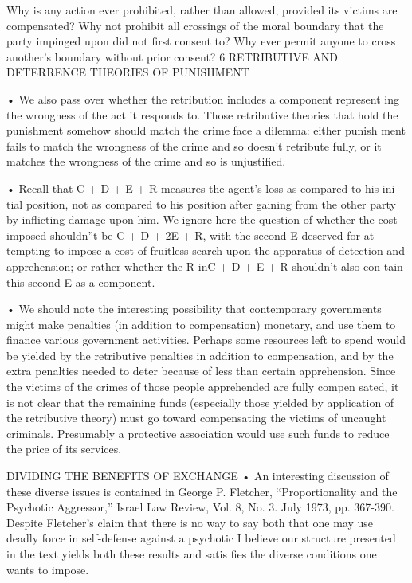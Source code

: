 \documentclass[11pt,openany]{book}
\begin{document}
{Why is any action ever prohibited, rather than allowed, provided its victims are compensated? Why not prohibit all crossings of the moral boundary that the party impinged upon did not first consent to? Why ever permit anyone to cross another's boundary without prior consent? 6 RETRIBUTIVE AND DETERRENCE THEORIES OF PUNISHMENT\par

• We also pass over whether the retribution includes a component represent ing the wrongness of the act it responds to. Those retributive theories that hold the punishment somehow should match the crime face a dilemma: either punish ment fails to match the wrongness of the crime and so doesn't retribute fully, or it matches the wrongness of the crime and so is unjustified.\par

• Recall that C + D + E + R measures the agent's loss as compared to his ini tial position, not as compared to his position after gaining from the other party by inflicting damage upon him. We ignore here the question of whether the cost imposed shouldn''t be C + D + 2E + R, with the second E deserved for at tempting to impose a cost of fruitless search upon the apparatus of detection and apprehension; or rather whether the R inC + D + E + R shouldn't also con tain this second E as a component.\par

• We should note the interesting possibility that contemporary governments might make penalties (in addition to compensation) monetary, and use them to finance various government activities. Perhaps some resources left to spend would be yielded by the retributive penalties in addition to compensation, and by the extra penalties needed to deter because of less than certain apprehension. Since the victims of the crimes of those people apprehended are fully compen sated, it is not clear that the remaining funds (especially those yielded by application of the retributive theory) must go toward compensating the victims of uncaught criminals. Presumably a protective association would use such funds to reduce the price of its services.\par

DIVIDING THE BENEFITS OF EXCHANGE • An interesting discussion of these diverse issues is contained in George P. Fletcher, ``Proportionality and the Psychotic Aggressor,'' Israel Law Review, Vol. 8, No. 3. July 1973, pp. 367-390. Despite Fletcher's claim that there is no way to say both that one may use deadly force in self-defense against a psychotic I believe our structure presented in the text yields both these results and satis fies the diverse conditions one wants to impose.\par

}
\end{document}
